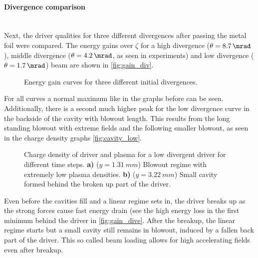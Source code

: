 \documentclass[bachelor_thesis]{subfiles}
\begin{document}
\paragraph*{Divergence comparison}\label{para:div_comp}\hspace{0pt} \\
Next, the driver qualities for three different divergences after passing the metal foil were compared. The energy gains over $\zeta$ for a high divergence ($\theta=\qty{8.7}{\mrad}$), middle divergence ($\theta=\qty{4.2}{\mrad}$, as seen in experiments) 
and low divergence ($\theta=\qty{1.7}{\mrad}$) beam are shown in \autoref{fig:gain_div}.
\begin{figure}
	\centering
	\missingfigure{}
	\caption{Energy gain curves for three different initial divergences.}
	\label{fig:gain_div}
\end{figure}
For all curves a normal maximum like in the graphs before can be seen. Additionally, there is a second much higher peak for the low divergence curve in the backside of the cavity with blowout length.
This results from the long standing blowout with extreme fields and the following smaller blowout, as seen in the charge density graphs \autoref{fig:cavity_low}.

\begin{figure}
	\centering
	\caption{Charge density of driver and plasma for a low divergent driver for different time steps.
	\textbf{a)} ($y=\qty{1.31}{mm}$) Blowout regime with extremely low plasma densities.
	\textbf{b)} ($y=\qty{3.22}{mm}$) Small cavity formed behind the broken up part of the driver.
	}
	\label{fig:cavity_low}
\end{figure}
Even before the cavities fill and a linear regime sets in, the driver breaks up as the strong forces cause fast energy drain (see the high energy loss in the first minimum behind the driver in \autoref{fig:gain_dive}. After the breakup, the linear regime starts but a small cavity still remains in blowout, induced by a fallen back part of the driver.
This so called beam loading allows for high accelerating fields even after breakup.
\end{document}
